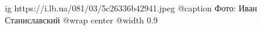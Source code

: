  
 
 
 
 

\ifcmt
  ig https://i.lb.ua/081/03/5c26336b42941.jpeg
	@caption Фото: Иван Станиславский
  @wrap center
  @width 0.9
\fi
